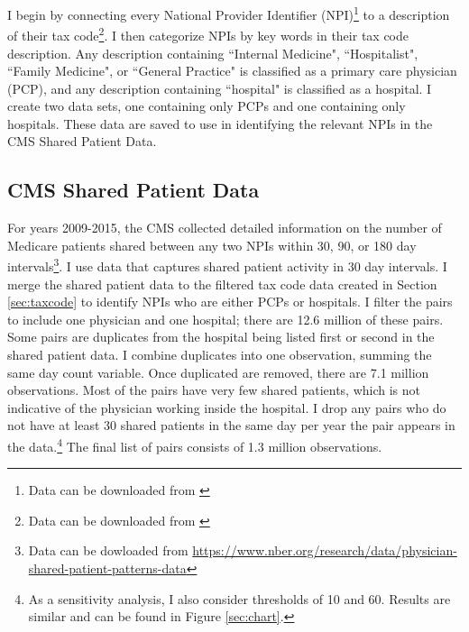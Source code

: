 \documentclass[12pt]{article}
\begin{document}
I begin by connecting every National Provider Identifier (NPI)\footnote{Data can be downloaded from \hyperlink{https://download.cms.gov/nppes/NPI/Files.html}{}} to a description of their tax code\footnote{Data can be downloaded from \hyperlink{https://nucc.org/index.php/code-sets-mainmenu-41/provider-taxonomy-mainmenu-40/pdf-mainmenu-53}{}}. I then categorize NPIs by key words in their tax code description. Any description containing ``Internal Medicine", ``Hospitalist", ``Family Medicine", or ``General Practice" is classified as a primary care physician (PCP), and any description containing ``hospital" is classified as a hospital. I create two data sets, one containing only PCPs and one containing only hospitals. These data are saved to use in identifying the relevant NPIs in the CMS Shared Patient Data. 



\subsection{CMS Shared Patient Data}\label{sec:sharedpat}

For years 2009-2015, the CMS collected detailed information on the number of Medicare patients shared between any two NPIs within 30, 90, or 180 day intervals\footnote{Data can be dowloaded from \hyperlink{https://www.nber.org/research/data/physician-shared-patient-patterns-data}{https://www.nber.org/research/data/physician-shared-patient-patterns-data}}. I use data that captures shared patient activity in 30 day intervals. I merge the shared patient data to the filtered tax code data created in Section \ref{sec:taxcode} to identify NPIs who are either PCPs or hospitals. I filter the pairs to include one physician and one hospital; there are 12.6 million of these pairs. Some pairs are duplicates from the hospital being listed first or second in the shared patient data. I combine duplicates into one observation, summing the same day count variable. Once duplicated are removed, there are 7.1 million observations. Most of the pairs have very few shared patients, which is not indicative of the physician working inside the hospital. I drop any pairs who do not have at least 30 shared patients in the same day per year the pair appears in the data.\footnote{As a sensitivity analysis, I also consider thresholds of 10 and 60. Results are similar and can be found in Figure \ref{sec:chart}.} The final list of pairs consists of 1.3 million observations. 
\end{document}
